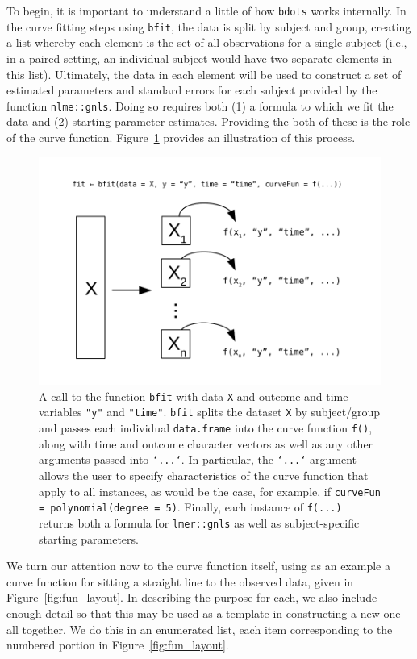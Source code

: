 \documentclass{article}
\newcommand{\xt}{\texttt}%
\begin{document}
To begin, it is important to understand a little of how \xt{bdots} works internally. In the curve fitting steps using \xt{bfit}, the data is split by subject and group, creating a list whereby each element is the set of all observations for a single subject (i.e., in a paired setting, an individual subject would have two separate elements in this list). Ultimately, the data in each element will be used to construct a set of estimated parameters and standard errors for each subject provided by the function \xt{nlme::gnls}. Doing so requires both (1) a formula to which  we fit the data and (2) starting parameter estimates. Providing the both of these is the role of the curve function. Figure~\ref{fig:curve_split} provides an illustration of this process.



\begin{figure}
\centering
\includegraphics{img/curve_split.pdf}
\caption{A call to the function \xt{bfit} with data \xt{X} and outcome and time variables \xt{"y"} and \xt{"time"}. \xt{bfit} splits the dataset \xt{X} by subject/group and passes each individual \xt{data.frame} into the curve function \xt{f()}, along with time and outcome character vectors as well as any other arguments passed into \xt{`...`}. In particular, the \xt{`...`} argument allows the user to specify characteristics of the curve function that apply to all instances, as would be the case, for example, if \xt{curveFun = polynomial(degree = 5)}. Finally, each instance of \xt{f(...)} returns both a formula for \xt{lmer::gnls} as well as subject-specific starting parameters.}
\label{fig:curve_split}
\end{figure}

We turn our attention now to the curve function itself, using as an example a curve function for sitting a straight line to the observed data, given in Figure~\ref{fig:fun_layout}. In describing the purpose for each, we also include enough detail so that this may be used as a template in constructing a new one all together. We do this in an enumerated list, each item corresponding to the numbered portion in Figure~\ref{fig:fun_layout}.
\end{document}
